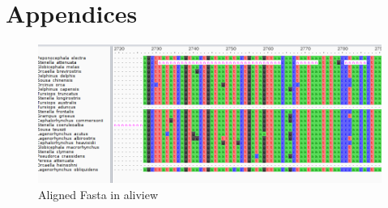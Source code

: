 \documentclass[12pt]{article}
\begin{document}
\section{Appendices}
\begin{figure}[h!]
    \centering
    \includegraphics[scale = 0.5, angle = 90]{alignfasta.png}
    \caption{Aligned Fasta in aliview}
    \label{fig:aliview}
\end{figure} 
\newpage
\end{document}
